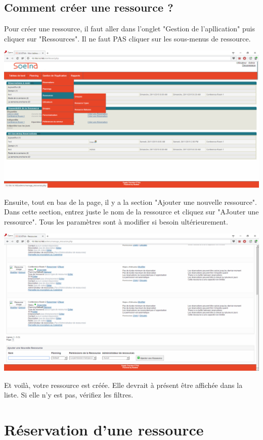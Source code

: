 \documentclass[a4paper,11pt]{article}
\begin{document}
\subsection{Comment créer une ressource ?}

Pour créer une ressource, il faut aller dans l'onglet "Gestion de l'apllication" puis cliquer sur "Ressources". Il ne faut PAS cliquer sur les sous-menus
de ressource.

\includegraphics[width=15cm]{./res1.PNG}

Ensuite, tout en bas de la page, il y a la section "Ajouter une nouvelle ressource". Dans cette section, entrez juste le nom de la ressource 
et cliquez sur "AJouter une ressource". Tous les paramètres sont à modifier si besoin ultérieurement.

\includegraphics[width=15cm]{./res2.PNG}

Et voilà, votre ressource est créée. Elle devrait à présent être affichée dans la liste. Si elle n'y est pas, vérifiez les filtres.

\section{Réservation d'une ressource}
\end{document}
